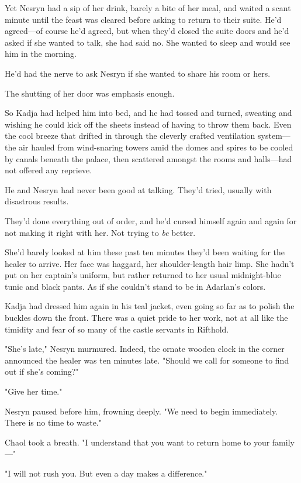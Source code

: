 Yet Nesryn had a sip of her drink, barely a bite of her meal, and waited a scant minute until the feast was cleared before asking to return to their suite. He'd agreed---of course he'd agreed, but when they'd closed the suite doors and he'd asked if she wanted to talk, she had said no. She wanted to sleep and would see him in the morning.

He'd had the nerve to ask Nesryn if she wanted to share his room or hers.

The shutting of her door was emphasis enough.

So Kadja had helped him into bed, and he had tossed and turned, sweating and wishing he could kick off the sheets instead of having to throw them back. Even the cool breeze that drifted in through the cleverly crafted ventilation system---the air hauled from wind-snaring towers amid the domes and spires to be cooled by canals beneath the palace, then scattered amongst the rooms and halls---had not offered any reprieve.

He and Nesryn had never been good at talking. They'd tried, usually with disastrous results.

They'd done everything out of order, and he'd cursed himself again and again for not making it right with her. Not trying to \emph{be} better.

She'd barely looked at him these past ten minutes they'd been waiting for the healer to arrive. Her face was haggard, her shoulder-length hair limp. She hadn't put on her captain's uniform, but rather returned to her usual midnight-blue tunic and black pants. As if she couldn't stand to be in Adarlan's colors.

Kadja had dressed him again in his teal jacket, even going so far as to polish the buckles down the front. There was a quiet pride to her work, not at all like the timidity and fear of so many of the castle servants in Rifthold.

"She's late," Nesryn murmured. Indeed, the ornate wooden clock in the corner announced the healer was ten minutes late. "Should we call for someone to find out if she's coming?"

"Give her time."

Nesryn paused before him, frowning deeply. "We need to begin immediately. There is no time to waste."

Chaol took a breath. "I understand that you want to return home to your family---"

"I will not rush you. But even a day makes a difference."

